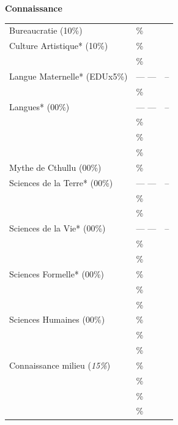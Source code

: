 \begin{multicols}{3}
	\textbf{Connaissance} \hrulefill ~\\  	%
	{\scriptsize \begin{tabular}[c]{ p{4.00cm} p{1.00cm}|c|}
		\cline{3-3}
		Bureaucratie (10\%)		& \dotfill \% & ~ \\
		\cline{3-3}
		Culture Artistique* (10\%)	& \dotfill \% & ~ \\
		\cline{3-3}
		\dotfill			& \dotfill \% & ~ \\
		\cline{3-3}
		Langue Maternelle* (EDUx5\%)	& --- ---     & -- \\
		\cline{3-3}
		\dotfill			& \dotfill \% & ~ \\
		\cline{3-3}
		Langues* (00\%)			& --- ---     & -- \\
		\cline{3-3}
		\dotfill			& \dotfill \% & ~ \\
		\cline{3-3}
		\dotfill			& \dotfill \% & ~ \\
		\cline{3-3}
		\dotfill			& \dotfill \% & ~ \\
		\cline{3-3}
		Mythe de Cthullu (00\%)		& \dotfill \% & ~ \\
		\cline{3-3}
		Sciences de la Terre* (00\%)	& --- ---     & -- \\
		\cline{3-3}
		\dotfill			& \dotfill \% & ~ \\
		\cline{3-3}
		\dotfill			& \dotfill \% & ~ \\
		Sciences de la Vie* (00\%)	& --- ---     & -- \\
		\cline{3-3}
		\dotfill			& \dotfill \% & ~ \\
		\cline{3-3}
		\dotfill			& \dotfill \% & ~ \\
		\cline{3-3}
		Sciences Formelle* (00\%)	& \dotfill \% & ~ \\
		\cline{3-3}
		\dotfill			& \dotfill \% & ~ \\
		\cline{3-3}
		\dotfill			& \dotfill \% & ~ \\
		\cline{3-3}
		Sciences Humaines (00\%)	& \dotfill \% & ~ \\
		\cline{3-3}
		\dotfill			& \dotfill \% & ~ \\
		\cline{3-3}
		\dotfill			& \dotfill \% & ~ \\
		\cline{3-3}
		Connaissance milieu (\emph{15\%})	& \dotfill \% & ~ \\
		\cline{3-3}
		\dotfill			& \dotfill \% & ~ \\
		\cline{3-3}
		\dotfill			& \dotfill \% & ~ \\
		\cline{3-3}
		\dotfill			& \dotfill \% & ~ \\
		\cline{3-3}
	\end{tabular} }~\\
	

\end{multicols}
